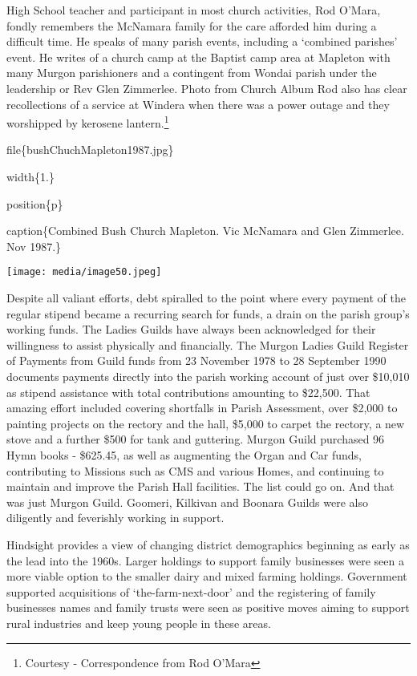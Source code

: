 High School teacher and participant in most church activities, Rod O'Mara, fondly remembers the McNamara family for the care afforded him during a difficult time. He speaks of many parish events, including a `combined parishes' event. He writes of a church camp at the Baptist camp area at Mapleton with many Murgon parishioners and a contingent from Wondai parish under the leadership or Rev Glen Zimmerlee. Photo from Church Album Rod also has clear recollections of a service at Windera when there was a power outage and they worshipped by kerosene lantern.\footnote{Courtesy - Correspondence from Rod O'Mara}

file\{bushChuchMapleton1987.jpg\}

width\{1.\}

position\{p\}

caption\{Combined Bush Church Mapleton. Vic McNamara and Glen Zimmerlee. Nov 1987.\}

\texttt{[image: media/image50.jpeg]}

Despite all valiant efforts, debt spiralled to the point where every payment of the regular stipend became a recurring search for funds, a drain on the parish group's working funds. The Ladies Guilds have always been acknowledged for their willingness to assist physically and financially. The Murgon Ladies Guild Register of Payments from Guild funds from 23 November 1978 to 28 September 1990 documents payments directly into the parish working account of just over \$10,010 as stipend assistance with total contributions amounting to \$22,500. That amazing effort included covering shortfalls in Parish Assessment, over \$2,000 to painting projects on the rectory and the hall, \$5,000 to carpet the rectory, a new stove and a further \$500 for tank and guttering. Murgon Guild purchased 96 Hymn books - \$625.45, as well as augmenting the Organ and Car funds, contributing to Missions such as CMS and various Homes, and continuing to maintain and improve the Parish Hall facilities. The list could go on. And that was just Murgon Guild. Goomeri, Kilkivan and Boonara Guilds were also diligently and feverishly working in support.

Hindsight provides a view of changing district demographics beginning as early as the lead into the 1960s. Larger holdings to support family businesses were seen a more viable option to the smaller dairy and mixed farming holdings. Government supported acquisitions of `the-farm-next-door' and the registering of family businesses names and family trusts were seen as positive moves aiming to support rural industries and keep young people in these areas.

